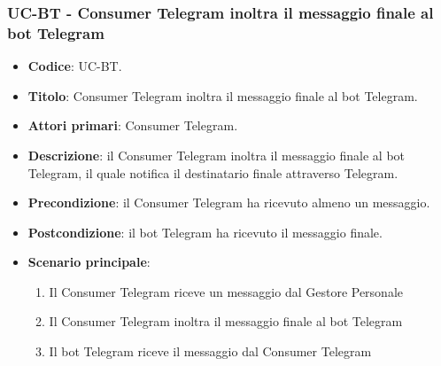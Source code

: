 \subsubsection{UC\theuccount-BT - Consumer Telegram inoltra il messaggio finale al bot Telegram}
	\begin{itemize}
		\item \textbf{Codice}: UC\theuccount-BT.
		\item \textbf{Titolo}: Consumer Telegram inoltra il messaggio finale al bot Telegram.
		\item \textbf{Attori primari}: Consumer Telegram.
		\item \textbf{Descrizione}: il Consumer Telegram inoltra il messaggio finale al bot Telegram, il quale notifica il destinatario finale attraverso Telegram.
		\item \textbf{Precondizione}: il Consumer Telegram ha ricevuto almeno un messaggio.
		\item \textbf{Postcondizione}: il bot Telegram ha ricevuto il messaggio finale.
		\item \textbf{Scenario principale}: 
		\begin{enumerate}
			\item Il Consumer Telegram riceve un messaggio dal Gestore Personale
			\item Il Consumer Telegram inoltra il messaggio finale al bot Telegram
            \item Il bot Telegram riceve il messaggio dal Consumer Telegram
		\end{enumerate}
		
	\end{itemize}